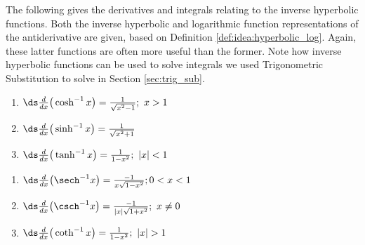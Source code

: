 The following gives the derivatives and integrals relating to the inverse hyperbolic functions. Both the inverse hyperbolic and logarithmic function representations of the antiderivative are given, based on Definition \ref{def:idea:hyperbolic_log}. Again, these latter functions are often more useful than the former. Note how inverse hyperbolic functions can be used to solve integrals we used Trigonometric Substitution to solve in Section \ref{sec:trig_sub}.





\begin{formulabox}
\label{idea:hyperbolic_inverse_derivatives}
{%
\begin{minipage}[t]{.45\textwidth}
\begin{enumerate}
\item $\ds\frac{d}{dx}\big(\cosh^{-1} x\big) = \frac{1}{\sqrt{x^2-1}};\ x>1$
\item $\ds\frac{d}{dx}\big(\sinh^{-1} x\big) = \frac{1}{\sqrt{x^2+1}}$
\item $\ds\frac{d}{dx}\big(\tanh^{-1} x\big) = \frac{1}{1-x^2};\ |x|<1$
\end{enumerate}
\end{minipage}
\begin{minipage}[t]{.55\textwidth}
\begin{enumerate}\addtocounter{enumi}{3}
\item $\ds\frac{d}{dx}\big(\sech^{-1} x\big) = \frac{-1}{x\sqrt{1-x^2}}; 0<x<1$
\item $\ds\frac{d}{dx}\big(\csch^{-1} x\big) = \frac{-1}{|x|\sqrt{1+x^2}};\ x\neq0$
\item $\ds\frac{d}{dx}\big(\coth^{-1} x\big) = \frac{1}{1-x^2};\ |x|>1$
\end{enumerate}
\end{minipage}
}
\end{formulabox}


